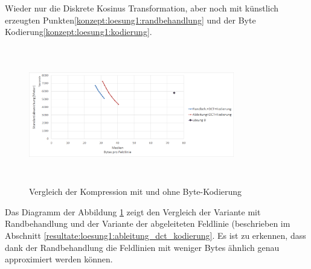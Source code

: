 Wieder nur die Diskrete Kosinus Transformation, aber noch mit künstlich erzeugten Punkten\ref{konzept:loesung1:randbehandlung} und der Byte Kodierung\ref{konzept:loesung1:kodierung}.
\begin{figure}[!htbp]
	\center
	\includegraphics[width=0.8\textwidth,height=6cm,keepaspectratio]{./pictures/resultate/loesung1/loesung1-7/loesung1_7.png}
	\caption{Vergleich der Kompression mit und ohne Byte-Kodierung}
	\label{resultate:loesung1:dct:randbehandlung}
\end{figure}
Das Diagramm der Abbildung \ref{resultate:loesung1:dct:randbehandlung} zeigt den Vergleich der Variante mit Randbehandlung und der Variante der abgeleiteten Feldlinie (beschrieben im Abschnitt \ref{resultate:loesung1:ableitung_dct_kodierung}. Es ist zu erkennen, dass dank der Randbehandlung die Feldlinien mit weniger Bytes ähnlich genau approximiert werden können.

